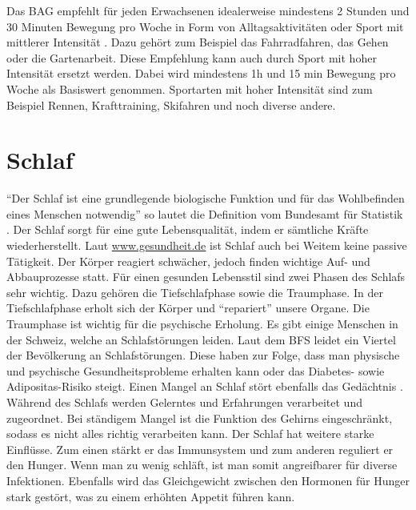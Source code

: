 \newline
Das BAG empfehlt für jeden Erwachsenen idealerweise mindestens 2 Stunden und 30 Minuten Bewegung pro Woche in Form von Alltagsaktivitäten oder Sport mit mittlerer Intensität \cite{bewegungsfoerderung}. Dazu gehört zum Beispiel das Fahrradfahren, das Gehen oder die Gartenarbeit. Diese Empfehlung kann auch durch Sport mit hoher Intensität ersetzt werden. Dabei wird mindestens 1h und 15 min Bewegung pro Woche als Basiswert genommen. Sportarten mit hoher Intensität sind zum Beispiel Rennen, Krafttraining, Skifahren und noch diverse andere. 
\section{Schlaf}
\authortoc{\bastian}{\sectionident}
“Der Schlaf ist eine grundlegende biologische Funktion und für das Wohlbefinden eines Menschen notwendig” so lautet die Definition vom Bundesamt für Statistik \cite{bundesamtfrstatistik_2015_schlafstoerungen}.
\newline
Der Schlaf sorgt für eine gute Lebensqualität, indem er sämtliche Kräfte wiederherstellt. Laut \url{www.gesundheit.de} ist Schlaf auch bei Weitem keine passive Tätigkeit. Der Körper reagiert schwächer, jedoch finden wichtige Auf- und Abbauprozesse statt. Für einen gesunden Lebensstil sind zwei Phasen des Schlafs sehr wichtig. Dazu gehören die Tiefschlafphase sowie die Traumphase. In der Tiefschlafphase erholt sich der Körper und “repariert” unsere Organe. Die Traumphase ist wichtig für die psychische Erholung. Es gibt einige Menschen in der Schweiz, welche an Schlafstörungen leiden. Laut dem BFS leidet ein Viertel der Bevölkerung an Schlafstörungen. Diese haben zur Folge, dass man physische und psychische Gesundheitsprobleme erhalten kann oder das Diabetes- sowie Adipositas-Risiko steigt. Einen Mangel an Schlaf stört ebenfalls das Gedächtnis \cite{schlaf-grundbeduerfnis-und-lebenselixier}. Während des Schlafs werden Gelerntes und Erfahrungen verarbeitet und zugeordnet. Bei ständigem Mangel ist die Funktion des Gehirns eingeschränkt, sodass es nicht alles richtig verarbeiten kann. Der Schlaf hat weitere starke Einflüsse. Zum einen stärkt er das Immunsystem und zum anderen reguliert er den Hunger. Wenn man zu wenig schläft, ist man somit angreifbarer für diverse Infektionen. Ebenfalls wird das Gleichgewicht zwischen den Hormonen für Hunger stark gestört, was zu einem erhöhten Appetit führen kann.
